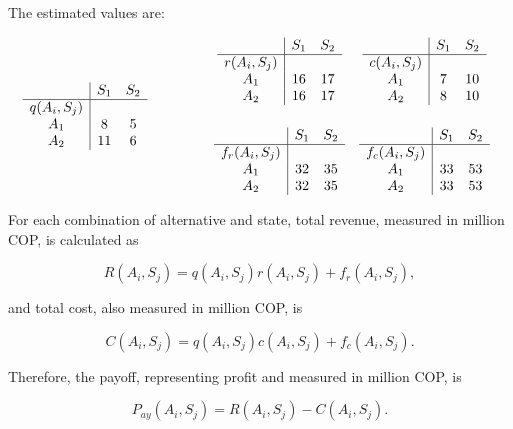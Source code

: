 The estimated values are:

\[
\begin{array}{c@{\hspace{1.5cm}}c}
	\begin{array}{c|cc}
		& S_1 & S_2 \\ \hline
		q(A_i,S_j) & & \\
		A_1 & 8 & 5 \\
		A_2 & 11 & 6
	\end{array}
	&
	\begin{array}{cc}
		\begin{array}{c|cc}
			& S_1 & S_2 \\ \hline
			r(A_i,S_j) & & \\
			A_1 & 16 & 17 \\
			A_2 & 16 & 17
		\end{array}
		&
		\begin{array}{c|cc}
			& S_1 & S_2 \\ \hline
			c(A_i,S_j) & & \\
			A_1 & 7 & 10 \\
			A_2 & 8 & 10
		\end{array}
		\\[1.2cm]
		\begin{array}{c|cc}
			& S_1 & S_2 \\ \hline
			f_r(A_i,S_j) & & \\
			A_1 & 32 & 35 \\
			A_2 & 32 & 35
		\end{array}
		&
		\begin{array}{c|cc}
			& S_1 & S_2 \\ \hline
			f_c(A_i,S_j) & & \\
			A_1 & 33 & 53 \\
			A_2 & 33 & 53
		\end{array}
	\end{array}
\end{array}
\]

For each combination of alternative and state, total revenue, measured in
million COP, is calculated as

\[
R(A_i,S_j)
=
q(A_i,S_j)r(A_i,S_j)
+
f_r(A_i,S_j),
\]

and total cost, also measured in million COP, is

\[
C(A_i,S_j)
=
q(A_i,S_j)c(A_i,S_j)
+
f_c(A_i,S_j).
\]

Therefore, the payoff, representing profit and measured in million COP, is

\[
P_{ay}(A_i,S_j)
=
R(A_i,S_j)-C(A_i,S_j).
\]

